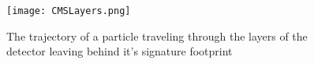 \begin{figure}[h]
	\centering
	\texttt{[image: CMSLayers.png]}
	\caption[Particle trajectories and footprint in CMS]{The trajectory of a particle traveling through the layers of the detector leaving behind it's signature footprint\label{CMSLayers}}
\end{figure}



